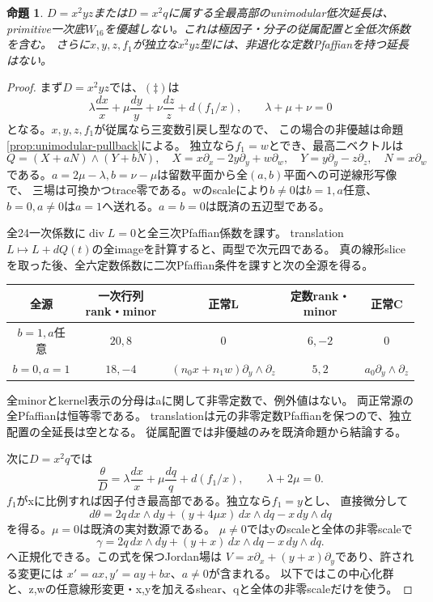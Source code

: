 \documentclass[a4paper,11pt]{ltjsarticle}
\newtheorem{proposition}{命題}[section]
\theoremstyle{definition}
\begin{document}
\begin{proposition}\label{prop:log-pole-boundaries}
$D=x^2yz$または$D=x^2q$に属する全最高部のunimodular低次延長は、
primitive一次底$W_{16}$を優越しない。これは極因子・分子の従属配置と全低次係数を含む。
さらに$x,y,z,f_1$が独立な$x^2yz$型には、非退化な定数Pfaffianを持つ延長はない。
\end{proposition}
\begin{proof}
まず$D=x^2yz$では、$(\ddagger)$は
\[
 \lambda\frac{dx}{x}+\mu\frac{dy}{y}+\nu\frac{dz}{z}
       +d(f_1/x),\qquad\lambda+\mu+\nu=0
\]
となる。$x,y,z,f_1$が従属なら三変数引戻し型なので、
この場合の非優越は命題\ref{prop:unimodular-pullback}による。
独立なら$f_1=w$とでき、最高二ベクトルは
\[
 Q=(X+aN)\wedge(Y+bN),\quad
 X=x\partial_x-2y\partial_y+w\partial_w,\quad
 Y=y\partial_y-z\partial_z,\quad N=x\partial_w
\]
である。$a=2\mu-\lambda,b=\nu-\mu$は留数平面から全$(a,b)$平面への可逆線形写像で、
三場は可換かつtrace零である。wのscaleにより$b\ne0$は$b=1,a$任意、
$b=0,a\ne0$は$a=1$へ送れる。$a=b=0$は既済の五辺型である。

全24一次係数に$\operatorname{div}L=0$と全三次Pfaffian係数を課す。
translation $L\mapsto L+dQ(t)$の全imageを計算すると、両型で次元四である。
真の線形sliceを取った後、全六定数係数に二次Pfaffian条件を課すと次の全源を得る。
\begin{center}\small
\begin{tabular}{c|c|c|c|c}
全源&一次行列rank・minor&正常L&定数rank・minor&正常C\\\hline
$b=1,a$任意&$20,8$&$0$&$6,-2$&$0$\\
$b=0,a=1$&$18,-4$&$(n_0x+n_1w)\partial_y\wedge\partial_z$&$5,2$&$a_0\partial_y\wedge\partial_z$
\end{tabular}
\end{center}
全minorとkernel表示の分母はaに関して非零定数で、例外値はない。
両正常源の全Pfaffianは恒等零である。
translationは元の非零定数Pfaffianを保つので、独立配置の全延長は空となる。
従属配置では非優越のみを既済命題から結論する。

次に$D=x^2q$では
\[
 \frac\theta D=\lambda\frac{dx}{x}+\mu\frac{dq}{q}+d(f_1/x),
 \qquad\lambda+2\mu=0.
\]
$f_1$がxに比例すれば因子付き最高部である。独立なら$f_1=y$とし、
直接微分して
\[
 d\theta=2q\,dx\wedge dy+(y+4\mu x)\,dx\wedge dq-x\,dy\wedge dq
\]
を得る。$\mu=0$は既済の実対数源である。
$\mu\ne0$ではyのscaleと全体の非零scaleで
\[
 \gamma=2q\,dx\wedge dy+(y+x)\,dx\wedge dq-x\,dy\wedge dq.       \tag{\P}
\]
へ正規化できる。この式を保つJordan場は
$V=x\partial_x+(y+x)\partial_y$であり、許される変更には
$x'=a x,y'=a y+b x$、$a\ne0$が含まれる。
以下ではこの中心化群と、z,wの任意線形変更・x,yを加えるshear、qと全体の非零scaleだけを使う。


\end{proof}
\end{document}
